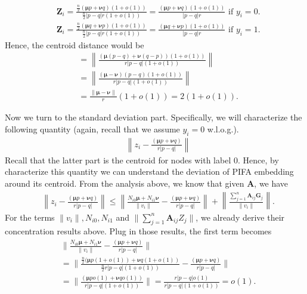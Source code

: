 \documentclass{article} %
\begin{document}
\begin{align}
	& \mathbf{Z}_i = \frac{\frac{n}{2}(\boldsymbol{\mu}p+\boldsymbol{\nu}q)(1+o(1))}{\frac{n}{2}|p-q|r(1+o(1))} = \frac{(\boldsymbol{\mu}p+\boldsymbol{\nu}q)(1+o(1))}{|p-q|r}\text{ if }y_i=0.\\
	& \mathbf{Z}_i = \frac{\frac{n}{2}(\boldsymbol{\mu}q+\boldsymbol{\nu}p)(1+o(1))}{\frac{n}{2}|p-q|r(1+o(1))} = \frac{(\boldsymbol{\mu}q+\boldsymbol{\nu}p)(1+o(1))}{|p-q|r}\text{ if }y_i=1.
\end{align}
Hence, the centroid distance would be
\begin{align}
	& = \left\| \frac{(\boldsymbol{\mu}(p-q)+\boldsymbol{\nu}(q-p))(1+o(1))}{ r|p-q|(1+o(1))}\right\| \\
	& = \left\| \frac{(\boldsymbol{\mu}-\boldsymbol{\nu})(p-q)(1+o(1))}{ r|p-q|(1+o(1))}\right\| \\
	& = \frac{\|\boldsymbol{\mu}-\boldsymbol{\nu}\|}{r}(1+o(1)) = 2(1+o(1)).
\end{align}

Now we turn to the standard deviation part. Specifically, we will characterize the following quantity (again, recall that we assume $y_i=0$ w.l.o.g.).
\begin{align}
	&\left\| z_i - \frac{(\boldsymbol{\mu}p+\boldsymbol{\nu}q)}{r|p-q|}\right\|
\end{align}
Recall that the latter part is the centroid for nodes with label $0$. Hence, by characterize this quantity we can understand the deviation of PIFA embedding around its centroid. From the analysis above, we know that given $\mathbf{A}$, we have
\begin{align}
	& \left\| z_i - \frac{(\boldsymbol{\mu}p+\boldsymbol{\nu}q)}{r|p-q|}\right\| \leq \left\| \frac{N_{i0}\boldsymbol{\mu}+N_{i1}\boldsymbol{\nu}}{\|v_i\|} - \frac{(\boldsymbol{\mu}p+\boldsymbol{\nu}q)}{r|p-q|}\right\| + \left\| \frac{\sum_{j=1}^n\mathbf{A}_{ij}\mathbf{G}_j}{\|v_i\|} \right\|.
\end{align}
For the terms $\|v_i\|, N_{i0}, N_{i1}$ and $\|\sum_{j=1}^n\mathbf{A}_{ij}Z_j\|$, we already derive their concentration results above. Plug in those results, the first term becomes
\begin{align}
	& \| \frac{N_{i0}\boldsymbol{\mu}+N_{i1}\boldsymbol{\nu}}{\|v_i\|} - \frac{(\boldsymbol{\mu}p+\boldsymbol{\nu}q)}{r|p-q|}\| \\
	& = \| \frac{ \frac{n}{2}(\boldsymbol{\mu}p(1+o(1))+\boldsymbol{\nu}q(1+o(1))}{\frac{n}{2}r|p-q|(1+o(1))} - \frac{(\boldsymbol{\mu}p+\boldsymbol{\nu}q)}{r|p-q|} \| \\
	& =  \| \frac{ (\boldsymbol{\mu}po(1)+\boldsymbol{\nu}qo(1))}{r|p-q|(1+o(1))}\| = \frac{r|p-q|o(1)}{r|p-q|(1+o(1))} = o(1).
\end{align}
\end{document}

